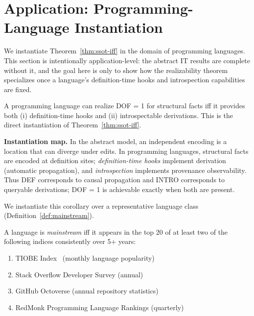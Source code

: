 \section{Application: Programming-Language Instantiation}\label{sec:evaluation}

We instantiate Theorem~\ref{thm:ssot-iff} in the domain of programming languages. This section is intentionally application-level: the abstract IT results are complete without it, and the goal here is only to show how the realizability theorem specializes once a language's definition-time hooks and introspection capabilities are fixed.

\begin{corollary}\label{cor:lang-realizability}
A programming language can realize DOF = 1 for structural facts iff it provides both (i) definition-time hooks and (ii) introspectable derivations. This is the direct instantiation of Theorem~\ref{thm:ssot-iff}.
\end{corollary}

\textbf{Instantiation map.} In the abstract model, an independent encoding is a location that can diverge under edits. In programming languages, structural facts are encoded at definition sites; \emph{definition-time hooks} implement derivation (automatic propagation), and \emph{introspection} implements provenance observability. Thus DEF corresponds to causal propagation and INTRO corresponds to queryable derivations; DOF = 1 is achievable exactly when both are present.

We instantiate this corollary over a representative language class (Definition~\ref{def:mainstream}).

\begin{definition}\label{def:mainstream}
A language is \emph{mainstream} iff it appears in the top 20 of at least two of the following indices consistently over 5+ years:
\begin{enumerate}
\tightlist
\item TIOBE Index~\cite{tiobe2024} (monthly language popularity)
\item Stack Overflow Developer Survey (annual)
\item GitHub Octoverse (annual repository statistics)
\item RedMonk Programming Language Rankings (quarterly)
\end{enumerate}
\end{definition}

